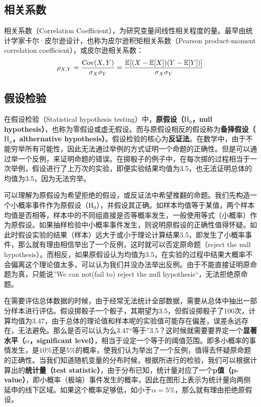 \documentclass[11pt]{article}
\begin{document}
\subsection{相关系数}

相关系数（Correlation Coefficient），为研究变量间线性相关程度的量。最早由统计学家卡尔·皮尔逊设计，也称为皮尔逊积矩相关系数（Pearson product-moment correlation coefficient），或皮尔逊相关系数：
\begin{equation*}
    \rho_{X,Y} = \frac{\operatorname{Cov}(X,Y)}{\sigma_X\sigma_Y}
    = \frac{\mathbb{E}[(X-\mathbb{E}[X])(Y-\mathbb{E}[Y])]}{\sigma_X\sigma_Y}
\end{equation*}


\subsection{假设检验}

在假设检验（Statistical hypothesis testing）中，\textbf{原假设（$\text{H}_0$，null hypothesis）}，也称为零假设或虚无假设。而与原假设相反的假设称为\textbf{备择假设（$\text{H}_a$，althernative hypothesis）}。假设检验的核心为\textbf{反证法}。在数学中，由于不能穷举所有可能性，因此无法通过举例的方式证明一个命题的正确性。但是可以通过举一个反例，来证明命题的错误。在掷骰子的例子中，在每次掷的过程相当于一次举例，假设进行了上万次的实验，即便实验结果均值为3.5，也无法证明总体的均值为3.5，因为无法穷举。

可以理解为原假设为希望拒绝的假设，或反证法中希望推翻的命题。我们先构造一个小概率事件作为原假设（$\text{H}_0$），并假设其正确。如样本均值等于某值，两个样本均值是否相等，样本中的不同组直接是否等概率发生，一般使用等式（小概率）作为原假设。如果抽样检验中小概率事件发生，则说明原假设的正确性值得怀疑。如此时假设实验的结果（样本）远大于或小于理论计算结果3.5，即发生了小概率事件，那么就有理由相信举出了一个反例，这时就可以否定原命题（reject the null hypothesis）。而相反，如果原假设认为均值为3.5，在实验的过程中结果大概率不会偏离这个理论值太多，可以认为我们并没办法举出反例。由于不能直接证明原命题为真，只能说”We can not(fail to) reject the null hypothesis“，无法拒绝原命题。

在需要评估总体数据的时候，由于经常无法统计全部数据，需要从总体中抽出一部分样本进行评估。假设掷骰子一个骰子，其期望为3.5，但假设掷骰子了100次，计算均值为3.47，由于总体的理论值和样本呢的实验值可能存在偏差，误差永远存在，无法避免。那么是否可以认为么3.47“等于”3.5？这时候就需要要界定一个\textbf{显著水平（$\alpha$，significant level）}，相当于设定一个等于的阈值范围。即多小概率的事情发生，是$10\%$还是$5\%$的概率，使我们认为举出了一个反例，值得去怀疑原命题的正确性。当我们知道随机变量的分布时候，根据所进行的检验，我们可以根据计算出的\textbf{统计量（test statistic）}，由于分布已知，统计量对应了一个\textbf{p值（p-value）}，即小概率（极端）事件发生的概率，因此在图形上表示为统计量向两侧延申的线下区域。如果这个概率足够低，如小于$\alpha=5\%$，那么就有理由拒绝原假设。
\end{document}
